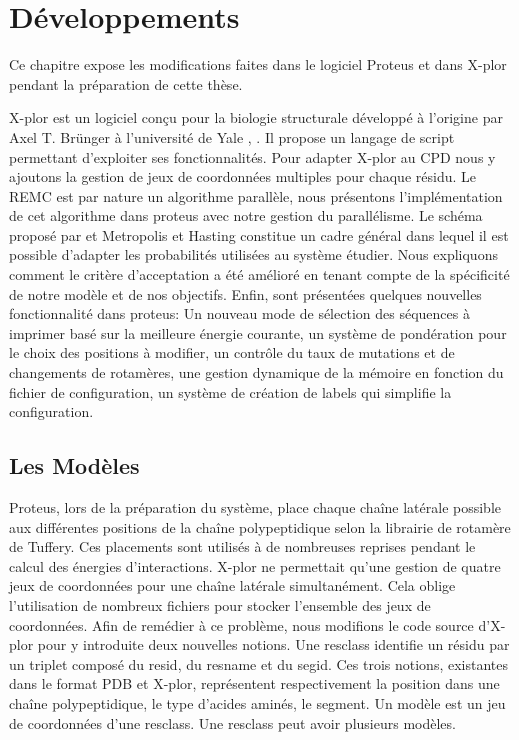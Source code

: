 \chapter{Développements}
\label{chap:developpements}

Ce chapitre expose les modifications faites dans le logiciel Proteus et dans X-plor pendant la préparation de cette thèse.

X-plor est un logiciel conçu pour la biologie structurale développé à l'origine par Axel T. Brünger à l'université de Yale , \citep{Brünger92}. Il propose un langage de script permettant d'exploiter ses fonctionnalités. Pour adapter X-plor au CPD nous y ajoutons la gestion de jeux de coordonnées multiples pour chaque résidu. Le REMC est par nature un algorithme parallèle, nous présentons l'implémentation de cet algorithme dans proteus avec notre gestion du parallélisme. Le schéma proposé par et Metropolis et Hasting constitue un cadre général dans lequel il est possible d'adapter les probabilités utilisées au système étudier. Nous expliquons comment le critère d'acceptation a été amélioré en tenant compte de la spécificité de notre modèle et de nos objectifs. Enfin, sont présentées quelques nouvelles fonctionnalité dans proteus: Un nouveau mode de sélection des séquences à imprimer basé sur la meilleure énergie courante, un système de pondération pour le choix des positions à modifier, un contrôle du taux de mutations et de changements de rotamères, une gestion dynamique de la mémoire en fonction du fichier de configuration, un système de création de labels qui simplifie la configuration.  


\section{Les Modèles }

Proteus, lors de la préparation du système, place chaque chaîne latérale possible aux différentes positions de la chaîne polypeptidique selon la librairie de rotamère de Tuffery. Ces placements sont utilisés à de nombreuses reprises pendant le calcul des énergies d'interactions. X-plor ne permettait qu'une gestion de quatre jeux de coordonnées pour une chaîne latérale simultanément. Cela oblige l'utilisation de nombreux fichiers pour stocker l'ensemble des jeux de coordonnées. Afin de remédier à ce problème, nous modifions le code source d'X-plor pour y introduite deux nouvelles notions. Une resclass identifie un résidu par un triplet composé du resid, du resname et du segid. Ces trois notions, existantes dans le format PDB et X-plor, représentent respectivement la position dans une chaîne polypeptidique, le type d'acides aminés, le segment. Un modèle est un jeu de coordonnées d'une resclass. Une resclass peut avoir plusieurs modèles.


